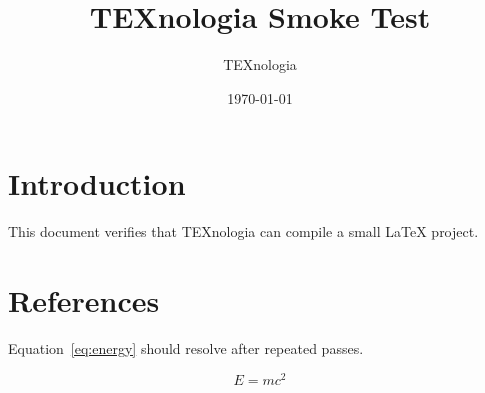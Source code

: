 \documentclass{article}
\title{TEXnologia Smoke Test}
\author{TEXnologia}
\date{\today}
\begin{document}
\maketitle

\section{Introduction}
This document verifies that TEXnologia can compile a small LaTeX project.

\section{References}
Equation~\ref{eq:energy} should resolve after repeated passes.

\begin{equation}
E = mc^2
\label{eq:energy}
\end{equation}
\end{document}
